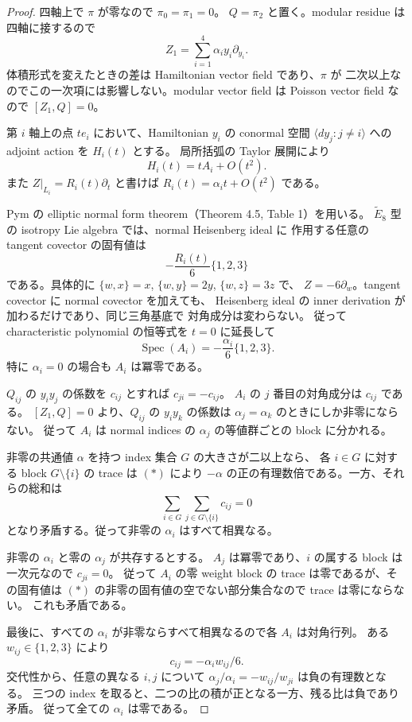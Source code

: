 \documentclass[11pt,a4paper]{ltjsarticle}
\theoremstyle{remark}\newtheorem{remark}[theorem]{注意}
\begin{document}
\begin{proof}
四軸上で $\pi$ が零なので $\pi_0=\pi_1=0$。
$Q=\pi_2$ と置く。modular residue は四軸に接するので
\[
 Z_1=\sum_{i=1}^4\alpha_i y_i\partial_{y_i}.
\]
体積形式を変えたときの差は Hamiltonian vector field であり、$\pi$ が
二次以上なのでこの一次項には影響しない。modular vector field は Poisson
vector field なので $[Z_1,Q]=0$。

第 $i$ 軸上の点 $t e_i$ において、Hamiltonian $y_i$ の conormal 空間
$\langle dy_j:j\ne i\rangle$ への adjoint action を $H_i(t)$ とする。
局所括弧の Taylor 展開により
\[
 H_i(t)=t A_i+O(t^2).
\]
また $Z|_{L_i}=R_i(t)\partial_t$ と書けば
$R_i(t)=\alpha_i t+O(t^2)$ である。

Pym の elliptic normal form theorem（Theorem 4.5, Table 1）を用いる。
$\widetilde E_8$ 型の isotropy Lie algebra では、normal Heisenberg ideal に
作用する任意の tangent covector の固有値は
\[
 -\frac{R_i(t)}6\{1,2,3\}
\]
である。具体的に $\{w,x\}=x$, $\{w,y\}=2y$, $\{w,z\}=3z$ で、
$Z=-6\partial_w$。tangent covector に normal covector を加えても、
Heisenberg ideal の inner derivation が加わるだけであり、同じ三角基底で
対角成分は変わらない。
従って characteristic polynomial の恒等式を $t=0$ に延長して
\[
 \operatorname{Spec}(A_i)
 =-\frac{\alpha_i}{6}\{1,2,3\}.
 \tag{*}
\]
特に $\alpha_i=0$ の場合も $A_i$ は冪零である。

$Q_{ij}$ の $y_i y_j$ の係数を $c_{ij}$ とすれば $c_{ji}=-c_{ij}$。
$A_i$ の $j$ 番目の対角成分は $c_{ij}$ である。
$[Z_1,Q]=0$ より、$Q_{ij}$ の $y_i y_k$ の係数は
$\alpha_j=\alpha_k$ のときにしか非零にならない。
従って $A_i$ は normal indices の $\alpha_j$ の等値群ごとの block に分かれる。

非零の共通値 $\alpha$ を持つ index 集合 $G$ の大きさが二以上なら、
各 $i\in G$ に対する block $G\setminus\{i\}$ の trace は $(*)$ により
$-\alpha$ の正の有理数倍である。一方、それらの総和は
\[
 \sum_{i\in G}\sum_{j\in G\setminus\{i\}}c_{ij}=0
\]
となり矛盾する。従って非零の $\alpha_i$ はすべて相異なる。

非零の $\alpha_i$ と零の $\alpha_j$ が共存するとする。
$A_j$ は冪零であり、$i$ の属する block は一次元なので $c_{ji}=0$。
従って $A_i$ の零 weight block の trace は零であるが、その固有値は
$(*)$ の非零の固有値の空でない部分集合なので trace は零にならない。
これも矛盾である。

最後に、すべての $\alpha_i$ が非零ならすべて相異なるので各 $A_i$ は対角行列。
ある $w_{ij}\in\{1,2,3\}$ により
\[
 c_{ij}=-\alpha_i w_{ij}/6.
\]
交代性から、任意の異なる $i,j$ について
$\alpha_j/\alpha_i=-w_{ij}/w_{ji}$ は負の有理数となる。
三つの index を取ると、二つの比の積が正となる一方、残る比は負であり矛盾。
従って全ての $\alpha_i$ は零である。
\end{proof}
\end{document}
